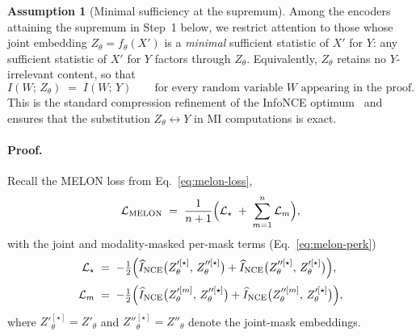 \documentclass{article}
\theoremstyle{plain}
\theoremstyle{definition}
\newtheorem{assumption}{Assumption}
\begin{document}
\begin{assumption}[Minimal sufficiency at the supremum]\label{ass:minimal-suff}
Among the encoders attaining the supremum in Step~1 below, we restrict attention to those whose joint embedding $Z_\theta = f_\theta(X')$ is a \emph{minimal} sufficient statistic of $X'$ for $Y$: any sufficient statistic of $X'$ for $Y$ factors through $Z_\theta$. Equivalently, $Z_\theta$ retains no $Y$-irrelevant content, so that
\begin{equation}\label{eq:min-suff}
  I(W;\, Z_\theta) \;=\; I(W;\, Y) \qquad \text{for every random variable } W \text{ appearing in the proof.}
\end{equation}
This is the standard compression refinement of the InfoNCE optimum~\citep{tian2020what,federici2020learning} and ensures that the substitution $Z_\theta \leftrightarrow Y$ in MI computations is exact.
\end{assumption}

\paragraph{Proof.}
Recall the MELON loss from Eq.~\ref{eq:melon-loss},
\begin{equation}\label{eq:melon-loss-restate}
  \mathcal{L}_{\mathrm{MELON}}
  \;=\; \frac{1}{n+1}\Bigl(\mathcal{L}_{\star} \;+\; \sum_{m=1}^{n} \mathcal{L}_{m}\Bigr),
\end{equation}
with the joint and modality-masked per-mask terms (Eq.~\ref{eq:melon-perk})
\begin{align}
  \mathcal{L}_{\star}
    &\;=\; -\tfrac{1}{2}\Bigl(\widehat{I}_{\mathrm{NCE}}\bigl(Z'^{[\star]}_\theta,\, Z''^{[\star]}_\theta\bigr) + \widehat{I}_{\mathrm{NCE}}\bigl(Z''^{[\star]}_\theta,\, Z'^{[\star]}_\theta\bigr)\Bigr),
    \label{eq:lstar}\\[2pt]
  \mathcal{L}_{m}
    &\;=\; -\tfrac{1}{2}\Bigl(\widehat{I}_{\mathrm{NCE}}\bigl(Z'^{[m]}_\theta,\, Z''^{[\star]}_\theta\bigr) + \widehat{I}_{\mathrm{NCE}}\bigl(Z''^{[m]}_\theta,\, Z'^{[\star]}_\theta\bigr)\Bigr),
    \label{eq:lm}
\end{align}
where $Z'^{[\star]}_\theta = Z'_\theta$ and $Z''^{[\star]}_\theta = Z''_\theta$ denote the joint-mask embeddings.
\end{document}
